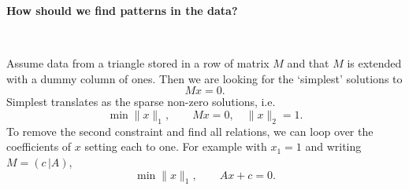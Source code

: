 \documentclass{article}
\begin{document}
\textbf{How should we find patterns in the data?}

\

Assume data from a triangle stored in a row of matrix $M$ and that $M$ is extended with a dummy column of ones. Then we are looking for the `simplest' solutions to 
\[ Mx = 0. \]
Simplest translates as the sparse non-zero solutions, i.e.
\[  \min \|x\|_1, \qquad Mx = 0, \quad \|x\|_2 = 1. \]
To remove the second constraint and find all relations, we can loop over the coefficients of $x$ setting each to one. For example with $x_1 = 1$ and writing $M = (c\, | A)$,
\[  \min \|x\|_1, \qquad Ax+c = 0. \]
\end{document}
